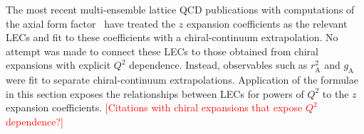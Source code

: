 The most recent multi-ensemble lattice QCD publications with computations
 of the axial form factor~\cite{Park:2021ypf,RQCD:2019jai}
 have treated the $z$ expansion coefficients as the relevant LECs
 and fit to these coefficients with a chiral-continuum extrapolation.
No attempt was made to connect these LECs to those obtained
 from chiral expansions with explicit $Q^2$ dependence.
Instead, observables such as $r_{\mathrm{A}}^2$ and $g_{\mathrm{A}}$
 were fit to separate chiral-continuum extrapolations.
Application of the formulae in this section exposes the relationships
 between LECs for powers of $Q^2$ to the $z$ expansion coefficients.
\textcolor{red}{[Citations with chiral expansions that expose $Q^2$ dependence?]}

